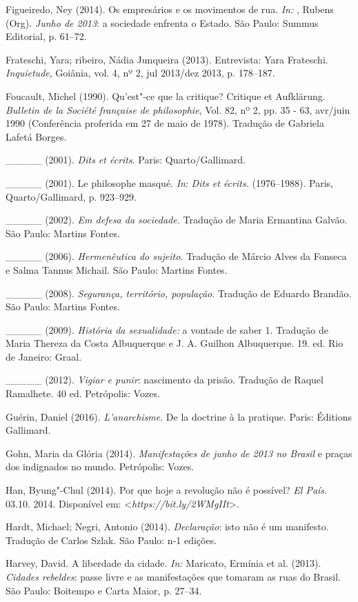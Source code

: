 Figueiredo, Ney (2014). Os empresários e os movimentos de rua. \emph{In:
}, Rubens (Org). \emph{Junho de 2013}: a sociedade enfrenta o
Estado. São Paulo: Summus Editorial, p. 61--72.

Frateschi, Yara; ribeiro, Nádia Junqueira (2013). Entrevista: Yara
Frateschi. \emph{Inquietude}, Goiânia, vol. 4, nº 2, jul 2013/dez 2013,
p. 178--187.

Foucault, Michel (1990). Qu'est"-ce que la critique? Critique et
Aufklärung. \emph{Bulletin de la Société française de philosophie}, Vol.
82, nº 2, pp. 35 - 63, avr/juin 1990 (Conferência proferida em 27 de
maio de 1978). Tradução de Gabriela Lafetá Borges.

\_\_\_\_\_ (2001). \emph{Dits et écrits}. Paris: Quarto/Gallimard.

\_\_\_\_\_ (2001). Le philosophe masqué. \emph{In}: \emph{Dits et
écrits. } (1976--1988). Paris, Quarto/Gallimard, p. 923--929.

\_\_\_\_\_ (2002). \emph{Em defesa da sociedade.} Tradução de Maria
Ermantina Galvão. São Paulo: Martins Fontes.

\_\_\_\_\_ (2006). \emph{Hermenêutica do sujeito}. Tradução de Márcio
Alves da Fonseca e Salma Tannus Michail. São Paulo: Martins Fontes.

\_\_\_\_\_ (2008). \emph{Segurança, território, população}. Tradução de
Eduardo Brandão. São Paulo: Martins Fontes.

\_\_\_\_\_ (2009). \emph{História da sexualidade:} a vontade de saber 1.
Tradução de Maria Thereza da Costa Albuquerque e J. A. Guilhon
Albuquerque. 19. ed. Rio de Janeiro: Graal.

\_\_\_\_\_ (2012). \emph{Vigiar e punir}: nascimento da prisão. Tradução
de Raquel Ramalhete. 40 ed. Petrópolis: Vozes.

Guérin, Daniel (2016). \emph{L'anarchisme}. De la doctrine à la
pratique. Paris: Éditions Gallimard.

Gohn, Maria da Glória (2014). \emph{Manifestações de junho de 2013 no
Brasil} e praças dos indignados no mundo. Petrópolis: Vozes.

Han, Byung"-Chul (2014). Por que hoje a revolução não é possível?
\emph{El País}. 03.10. 2014. Disponível em:
\textless{}\emph{https://bit.ly/2WMgIIt}\textgreater{}.

Hardt, Michael; Negri, Antonio (2014). \emph{Declaração}: isto não é um
manifesto. Tradução de Carlos Szlak. São Paulo: n-1 edições.

Harvey, David. A liberdade da cidade. \emph{In: }Maricato, Ermínia et
al. (2013). \emph{Cidades rebeldes}: passe livre e as manifestações que
tomaram as ruas do Brasil. São Paulo: Boitempo e Carta Maior, p. 27--34.

